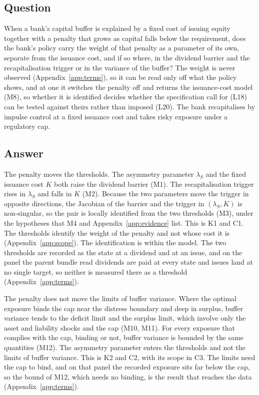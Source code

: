 \subsection{Question}

When a bank's capital buffer is explained by a fixed cost of issuing equity
together with a penalty that grows as capital falls below the requirement, does
the bank's policy carry the weight of that penalty as a parameter of its own,
separate from the issuance cost, and if so where, in the dividend barrier and
the recapitalisation trigger or in the variance of the buffer? The weight is
never observed (Appendix~\ref{app:terms}), so it can be read only off what the
policy shows, and at one it switches the penalty off and returns the
issuance-cost model (M8), so whether it is identified decides whether the
specification \citet{peura2006} call for (L18) can be tested against theirs
rather than imposed (L20). The bank recapitalises by impulse control at a fixed
issuance cost and takes risky exposure under a regulatory cap.

\subsection{Answer}

The penalty moves the thresholds. The asymmetry parameter $\lambda_S$ and the
fixed issuance cost $K$ both raise the dividend barrier (M1). The
recapitalisation trigger rises in $\lambda_S$ and falls in $K$ (M2). Because the
two parameters move the trigger in opposite directions, the Jacobian of the
barrier and the trigger in $(\lambda_S,K)$ is non-singular, so the pair is
locally identified from the two thresholds (M3), under the hypotheses that M4
and Appendix~\ref{app:evidence} list. This is K1 and C1. The thresholds
identify the weight of the penalty and not whose cost it is (Appendix~\ref{app:scope}).
The identification is within the model. The two thresholds are recorded as the
state at a dividend and at an issue, and on the panel the parent bundle read
dividends are paid at every state and issues land at no single target, so
neither is measured there as a threshold (Appendix~\ref{app:terms}).

The penalty does not move the limits of buffer variance. Where the optimal
exposure binds the cap near the distress boundary and deep in surplus, buffer
variance tends to the deficit limit and the surplus limit, which involve only
the asset and liability shocks and the cap (M10, M11). For every exposure that
complies with the cap, binding or not, buffer variance is bounded by the same
quantities (M12). The asymmetry parameter enters the thresholds and not the
limits of buffer variance. This is K2 and C2, with its scope in C3. The
limits need the cap to bind, and on that panel the recorded exposure sits far
below the cap, so the bound of M12, which needs no binding, is the result that
reaches the data (Appendix~\ref{app:terms}).

